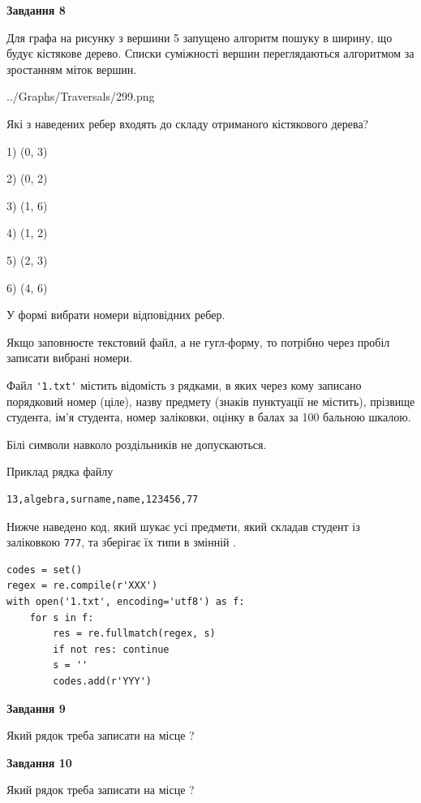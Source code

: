 \documentclass[12pt, ukrainian]{article}
\def\code#1{\Verb!#1!}
\begin{document}
{\begin {large}
{\begin {center}\textbf{Завдання 8}\end {center}}\par
Для графа на рисунку з вершини 5 запущено алгоритм пошуку в ширину, що будує кістякове дерево. Списки суміжності вершин переглядаються алгоритмом за зростанням міток вершин.\par
\begin{center}
	{../Graphs/Traversals/299.png}
\end{center}
\par Які з наведених ребер входять до складу отриманого кістякового дерева?\par
1) (0, 3)\par
2) (0, 2)\par
3) (1, 6)\par
4) (1, 2)\par
5) (2, 3)\par
6) (4, 6)\par
{\vskip 15pt} У формі вибрати номери відповідних ребер.


Якщо заповнюєте текстовий файл, а не гугл-форму, то потрібно через пробіл записа\-ти вибрані номери.\par
\newpage


Файл \code{'1.txt'} містить відомість з рядками, в яких через кому записано поряд\-ковий номер (ціле), назву предмету (знаків пунктуації не містить), прізвище студента, ім'я студента, номер заліковки, оцінку в балах за 100 бальною шкалою.

Білі символи навколо роздільників не допускаються.

Приклад рядка файлу



\begin{verbatim}
13,algebra,surname,name,123456,77
\end{verbatim}


Нижче наведено код, який шукає усі предмети, який складав студент із заліковкою \code{777}, та зберігає їх типи в змінній .



\begin{verbatim}
codes = set()
regex = re.compile(r'XXX')
with open('1.txt', encoding='utf8') as f:
    for s in f:
        res = re.fullmatch(regex, s)
        if not res: continue
        s = ''
        codes.add(r'YYY')
\end{verbatim}


{\begin {center}\textbf{Завдання 9}\end {center}}\par
Який рядок треба записати на місце  ?\par
\vspace{5mm}


{\begin {center}\textbf{Завдання 10}\end {center}}\par
Який рядок треба записати на місце  ?\par


\newpage


\end {large}}
\end{document}
